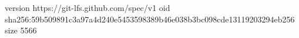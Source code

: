 version https://git-lfs.github.com/spec/v1
oid sha256:59b509891c3a97a4d240e5453598389b46e038b3bc098cde13119203294eb256
size 5566
